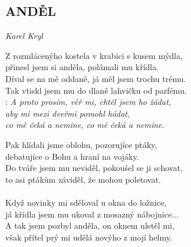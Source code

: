 \begin{flushleft}
	\section*{\Huge ANDĚL}
	\emph{Karel Kryl}
\end{flushleft}

Z rozmlácenýho kostela
v krabici s kusem mýdla,\\
přinesl jsem si anděla,
polámali mu křídla.\\
Díval se na mě oddaně,
já měl jsem trochu trému.\\
Tak vtiskl jsem mu do dlaně
lahvičku od parfému.\\

\textregistered:
\emph{A proto prosím, věř mi, chtěl jsem ho žádat,\\
aby mi mezi dveřmi pomohl hádat,\\
co mě čeká \hspace{0.6cm} a nemine,
co mě čeká \hspace{0.6cm} a nemine.\\
}

Pak hlídali jsme oblohu, pozorujíce ptáky,\\
debatujíce o Bohu a hraní na vojáky.\\
Do tváře jsem mu neviděl, pokoušel se ji schovat,\\
to asi ptákům záviděl, že mohou poletovat.\\
\textregistered\\

Když novinky mi sděloval u okna do ložnice,\\
já křídla jsem mu ukoval z mosazný nábojnice...\\
A tak jsem pozbyl anděla, on oknem uletěl mi,\\
však přítel prý mi udělá novýho z mojí helmy.\\
\textregistered

\newpage